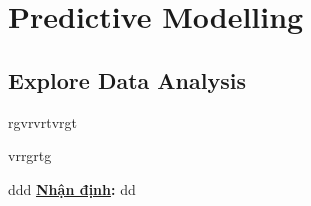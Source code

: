 \chapter{Predictive Modelling}

\section{Explore Data Analysis}

rgvrvrtvrgt \par
vrrgrtg \par

ddd \textbf{\underline{Nhận định}:} dd